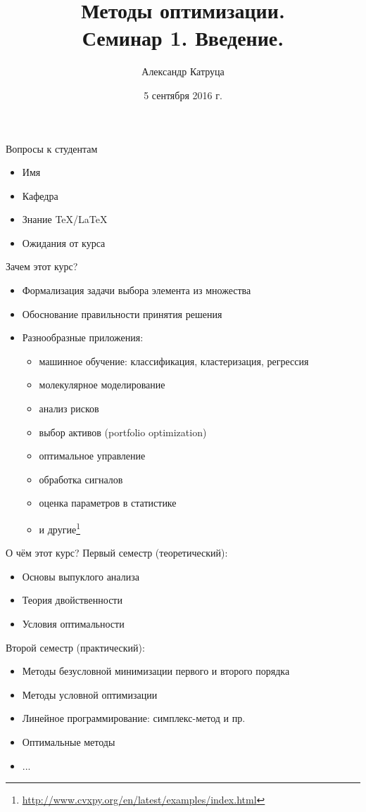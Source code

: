 \documentclass[12pt]{beamer}
\title[Семинар 1]{Методы оптимизации. \\
Семинар 1. Введение.}
\author{Александр Катруца}
\institute{Московский физико-технический институт,\\
Факультет Управления и Прикладной Математики}
\date{5 сентября 2016 г.}
\begin{document}
\begin{frame}
\titlepage
\end{frame}

\begin{frame}{Вопросы к студентам}
\begin{itemize}
\item Имя
\item Кафедра
\item Знание \TeX/\LaTeX
\item Ожидания от курса
\end{itemize}

\end{frame}

\begin{frame}{Зачем этот курс?}
\begin{itemize}
\item Формализация задачи выбора элемента из множества
\item Обоснование правильности принятия решения
\item Разнообразные приложения:
\begin{itemize}
\item машинное обучение: классификация, кластеризация, регрессия
\item молекулярное моделирование
\item анализ рисков
\item выбор активов (portfolio optimization)
\item оптимальное управление
\item обработка сигналов
\item оценка параметров в статистике 
\item и другие\footnote{\url{http://www.cvxpy.org/en/latest/examples/index.html}}
\end{itemize}
\end{itemize}
\end{frame}

\begin{frame}{О чём этот курс?}
Первый семестр (теоретический):
\begin{itemize}
\item Основы выпуклого анализа
\item Теория двойственности
\item Условия оптимальности
\end{itemize}

Второй семестр (практический):
\begin{itemize}
\item Методы безусловной минимизации первого и второго порядка 
\item Методы условной оптимизации
\item Линейное программирование: симплекс-метод и пр.
\item Оптимальные методы
\item ...
\end{itemize}
\end{frame}
\end{document}
